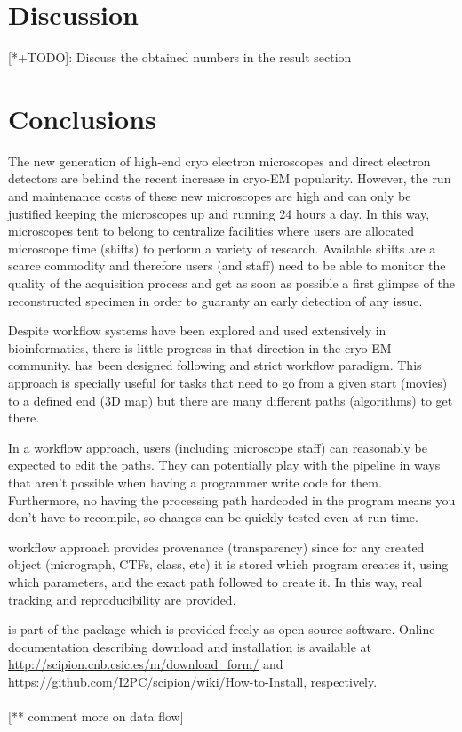 \section{Discussion}
[*+TODO]: Discuss the obtained numbers in the result section

\section{Conclusions}

The new generation of high-end cryo electron microscopes and direct electron detectors are behind the recent increase in cryo-EM  popularity. However, the run and maintenance costs of these new microscopes are high and can only be justified keeping the microscopes up and running 24 hours a day. In this way, microscopes tent to belong to centralize facilities where users are allocated microscope time (shifts) to perform a variety of research. Available shifts are a scarce commodity and therefore users (and staff) need to be able to monitor the quality of the acquisition process and get as soon as possible a first glimpse of the reconstructed specimen in order to guaranty an early detection of any issue. 

 Despite workflow systems have been explored and used extensively in bioinformatics, there is little progress in that direction in the cryo-EM community. \scipionbox has been designed following and strict workflow paradigm. This approach is specially useful for tasks that need to go from a given start (movies) to a defined end (3D map) but there are many different paths (algorithms) to get there.
 
 In a workflow approach, users (including microscope staff) can reasonably be expected to edit the paths. They can potentially play with the pipeline in ways that aren't possible when having a programmer write code for them. Furthermore, no having the processing path hardcoded in the program means you don't have to recompile, so changes can be quickly tested   even at run time.
 
 \scipionbox workflow approach provides provenance (transparency) since for any created object (micrograph, CTFs, class, etc) it is stored which program creates it, using which parameters, and the exact path followed to create it.  In this way,  real tracking and reproducibility are provided. 

 
\scipionbox is part of the \scipion package which is provided 
freely as open source software. Online documentation
describing \scipion download and installation is available
at \url{http://scipion.cnb.csic.es/m/download_form/} and \url{https://github.com/I2PC/scipion/wiki/How-to-Install}, respectively.\\\\


[** comment more on data flow]






 